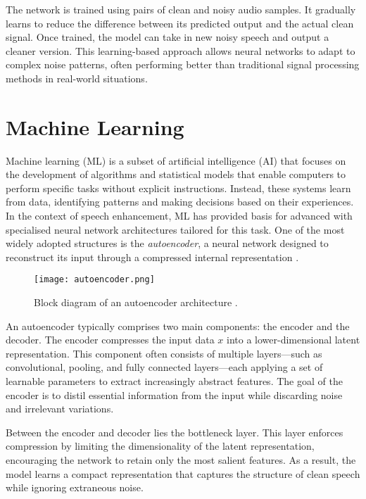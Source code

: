The network is trained using pairs of clean and noisy audio samples. It gradually learns to reduce the difference between its predicted output and the actual clean signal. Once trained, the model can take in new noisy speech and output a cleaner version. This learning-based approach allows neural networks to adapt to complex noise patterns, often performing better than traditional signal processing methods in real-world situations.

\section{Machine Learning}
\label{sec:machine_learning}

Machine learning (ML) is a subset of artificial intelligence (AI) that focuses on the development of algorithms and statistical models that enable computers to perform specific tasks without explicit instructions. Instead, these systems learn from data, identifying patterns and making decisions based on their experiences. In the context of speech enhancement, ML has provided basis for advanced with specialised neural network architectures tailored for this task. One of the most widely adopted structures is the \textit{autoencoder}, a neural network designed to reconstruct its input through a compressed internal representation \cite{azarang2020review}.

\begin{figure}[h]
    \centering
    \texttt{[image: autoencoder.png]}
    \caption{\label{fig:autoencoder} Block diagram of an autoencoder architecture \cite{vachhani2017dae}.}
\end{figure}

An autoencoder typically comprises two main components: the encoder and the decoder. The encoder compresses the input data \(x\) into a lower-dimensional latent representation. This component often consists of multiple layers—such as convolutional, pooling, and fully connected layers—each applying a set of learnable parameters to extract increasingly abstract features. The goal of the encoder is to distil essential information from the input while discarding noise and irrelevant variations.

Between the encoder and decoder lies the bottleneck layer. This layer enforces compression by limiting the dimensionality of the latent representation, encouraging the network to retain only the most salient features. As a result, the model learns a compact representation that captures the structure of clean speech while ignoring extraneous noise.

